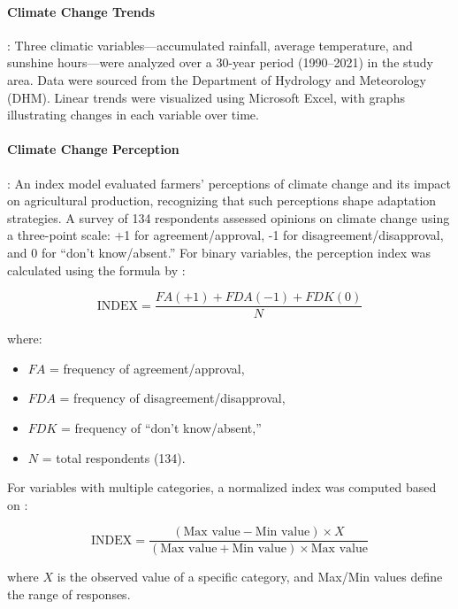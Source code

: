 \paragraph{Climate Change Trends} : 
Three climatic variables---accumulated rainfall, average temperature, and sunshine hours---were analyzed over a 30-year period (1990--2021) in the study area. Data were sourced from the Department of Hydrology and Meteorology (DHM). Linear trends were visualized using Microsoft Excel, with graphs illustrating changes in each variable over time.

\paragraph{Climate Change Perception}: 
An index model evaluated farmers’ perceptions of climate change and its impact on agricultural production, recognizing that such perceptions shape adaptation strategies. A survey of 134 respondents assessed opinions on climate change using a three-point scale: +1 for agreement/approval, -1 for disagreement/disapproval, and 0 for “don’t know/absent.” For binary variables, the perception index was calculated using the formula by \citep{dahalNutrientManagementSustainability2021}:

\[
\text{INDEX} = \frac{FA(+1) + FDA(-1) + FDK(0)}{N}
\]

where:
\begin{itemize}
    \item $FA$ = frequency of agreement/approval,
    \item $FDA$ = frequency of disagreement/disapproval,
    \item $FDK$ = frequency of “don’t know/absent,”
    \item $N$ = total respondents (134).
\end{itemize}

For variables with multiple categories, a normalized index was computed based on \citep{nguyenduycanAssessingLivelihoodVulnerability2019}:

\[
\text{INDEX} = \frac{(\text{Max value} - \text{Min value}) \times X}{(\text{Max value} + \text{Min value}) \times \text{Max value}}
\]

where $X$ is the observed value of a specific category, and Max/Min values define the range of responses.
